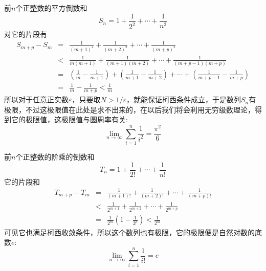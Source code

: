 \begin{example}
  前$n$个正整数的平方倒数和
  \[ S_n = 1 + \frac{1}{2^2} + \cdots + \frac{1}{n^2} \]
  对它的片段有
  \begin{eqnarray*}
    S_{m+p}-S_m  & = & \frac{1}{(m+1)^2} + \frac{1}{(m+2)^2} + \cdots + \frac{1}{(m+p)^2} \\
                 & < & \frac{1}{m(m+1)} + \frac{1}{(m+1)(m+2)} + \cdots + \frac{1}{(m+p-1)(m+p)} \\
                 & = & \left( \frac{1}{m} - \frac{1}{m+1} \right) + \left( \frac{1}{m+1} - \frac{1}{m+2} \right) + \cdots + \left( \frac{1}{m+p-1} - \frac{1}{m+p} \right) \\
    & = & \frac{1}{m} - \frac{1}{m+p} < \frac{1}{m}
  \end{eqnarray*}
  所以对于任意正实数$\varepsilon$，只要取$N>1/\varepsilon$，就能保证柯西条件成立，于是数列$S_n$有极限，不过这极限值在此处是求不出来的，在以后我们将会利用无穷级数理论，得到它的极限值，这极限值与圆周率有关:
  \[ \lim_{n \to \infty} \sum_{i=1}^n \frac{1}{i^2} = \frac{\pi^2}{6} \]
\end{example}

\begin{example}
  前$n$个正整数的阶乘的倒数和
  \[ T_n = 1 + \frac{1}{2!} + \cdots + \frac{1}{n!} \]
  它的片段和
  \begin{eqnarray*}
    T_{m+p} - T_m & = & \frac{1}{(m+1)!} + \frac{1}{(m+2)!} + \cdots + \frac{1}{(m+p)!} \\
                  & < & \frac{1}{2^{m+1}} + \frac{1}{2^{m+2}} + \cdots + \frac{1}{2^{m+p}} \\
    & = & \frac{1}{2^m} \left( 1-\frac{1}{2^p} \right) < \frac{1}{2^m}
  \end{eqnarray*}
  可见它也满足柯西收敛条件，所以这个数列也有极限，它的极限便是自然对数的底数$e$:
  \[ \lim_{n \to \infty} \sum_{i=1}^n \frac{1}{i!} = e \]
\end{example}

